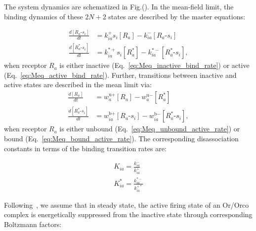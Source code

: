 The system dynamics are schematized in Fig.(). In the mean-field limit, the binding dynamics of these $2N + 2$ states are described by the master equations:

\begin{align}
\frac{d[R_a\text{-}s_i]}{dt} &= k^+_{ia}s_i[R_a] - k^-_{ia}[R_a\text{-}s_i] \label{eq:Meq_inactive_bind_rate}\\
\frac{d[R^*_a\text{-}s_i]}{dt} &= k^{*+}_{ia}s_i[R^*_a] - k^{*-}_{ia}[R^*_a\text{-}s_i],
\label{eq:Meq_active_bind_rate}
\end{align}
when receptor $R_a$ is either inactive (Eq.~\ref{eq:Meq_inactive_bind_rate}) or active (Eq.~\ref{eq:Meq_active_bind_rate}). Further, transitions between inactive and active states are described in the mean limit via:
\begin{align}
\frac{d[R_a]}{dt} &= w^{\text{u}+}_a [R_a] - w^{\text{u}-}_a [R^*_a] \label{eq:Meq_unbound_active_rate}\\
\frac{d[R^*_a\text{-}s_i]}{dt} &=  w^{\text{b}+}_{ia} [R_a\text{-}s_i] - w^{\text{b}-}_{ia}  [R^*_a\text{-}s_i],
\label{eq:Meq_bound_active_rate}
\end{align}
when receptor $R_a$ is either unbound (Eq.~\ref{eq:Meq_unbound_active_rate}) or bound (Eq.~\ref{eq:Meq_bound_active_rate}). The corresponding disassociation constants in terms of the binding transition rates are:


\begin{align}
K_{ia} = \frac{k^-_{ia}}{k^+_{ia}} \nonumber \\
K^*_{ia} = \frac{k^{*-}_{ia}}{k^{+*}_{ia}} 
\label{eq:Kd}
\end{align}

Following~\cite{srinivas_elife}, we assume that in steady state, the active firing state of an Or/Orco complex is energetically suppressed from the inactive state through corresponding Boltzmann factors:

